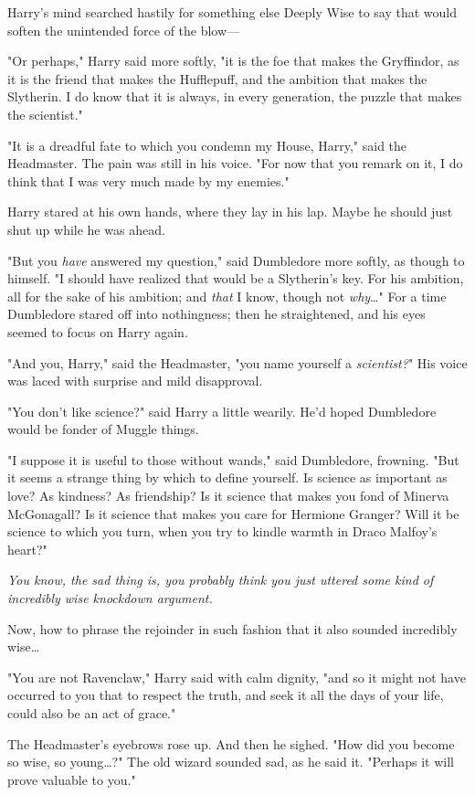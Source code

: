 Harry's mind searched hastily for something else Deeply Wise to say that would
soften the unintended force of the blow---

"Or perhaps," Harry said more softly, "it is the foe that makes the Gryffindor,
as it is the friend that makes the Hufflepuff, and the ambition that makes the
Slytherin. I do know that it is always, in every generation, the puzzle that
makes the scientist."

"It is a dreadful fate to which you condemn my House, Harry," said the
Headmaster. The pain was still in his voice. "For now that you remark on it, I
do think that I was very much made by my enemies."

Harry stared at his own hands, where they lay in his lap. Maybe he should just
shut up while he was ahead.

"But you \emph{have} answered my question," said Dumbledore more softly, as
though to himself. "I should have realized that would be a Slytherin's key. For
his ambition, all for the sake of his ambition; and \emph{that} I know, though
not \emph{why}{\ldots}" For a time Dumbledore stared off into nothingness; then
he straightened, and his eyes seemed to focus on Harry again.

"And you, Harry," said the Headmaster, "you name yourself a \emph{scientist?}"
His voice was laced with surprise and mild disapproval.

"You don't like science?" said Harry a little wearily. He'd hoped Dumbledore
would be fonder of Muggle things.

"I suppose it is useful to those without wands," said Dumbledore, frowning.
"But it seems a strange thing by which to define yourself. Is science as
important as love? As kindness? As friendship? Is it science that makes you
fond of Minerva McGonagall? Is it science that makes you care for Hermione
Granger? Will it be science to which you turn, when you try to kindle warmth in
Draco Malfoy's heart?"

\emph{You know, the sad thing is, you probably think you just uttered some kind
of incredibly wise knockdown argument.}

Now, how to phrase the rejoinder in such fashion that it also sounded
incredibly wise{\ldots}

"You are not Ravenclaw," Harry said with calm dignity, "and so it might not
have occurred to you that to respect the truth, and seek it all the days of
your life, could also be an act of grace."

The Headmaster's eyebrows rose up. And then he sighed. "How did you become so
wise, so young{\ldots}?" The old wizard sounded sad, as he said it. "Perhaps it
will prove valuable to you."

